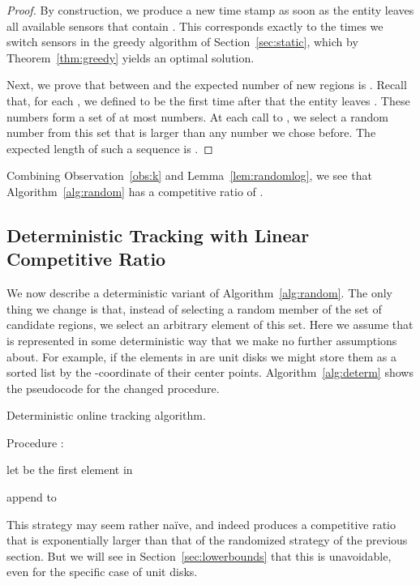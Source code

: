 \documentclass[runningheads]{llncs}
\begin{document}
      \begin {proof}
        By construction, we produce a new time stamp  as soon as the entity leaves all available sensors that contain . This corresponds exactly to the times we switch sensors in the greedy algorithm of Section~\ref {sec:static}, which by Theorem~\ref {thm:greedy} yields an optimal solution.
        
        Next, we prove that between  and  the expected number of new regions is .
        Recall that, for each , we defined  to be the first time after  that the entity leaves .
        These numbers  form a set of at most  numbers. At each call to , we select a random number from this set that is larger than any number we chose before.
        The expected length of such a sequence is .
      \end {proof}

      Combining Observation~\ref {obs:k} and Lemma~\ref {lem:randomlog}, we see
      that Algorithm~\ref {alg:random} has a competitive ratio of .

    \subsection {Deterministic Tracking with Linear Competitive Ratio}
      We now describe a deterministic variant of Algorithm~\ref {alg:random}. The only thing we change is
 that, instead of selecting a random member of the set  of candidate regions, we select an arbitrary element of this set.   Here we assume that  is represented in some deterministic way that we make no further assumptions about. For example, if the elements in  are unit disks we might store them as a sorted list by the -coordinate of their center points. Algorithm~\ref {alg:determ}  shows the pseudocode for the changed procedure.
         
      \begin {algorithm} [ht]
        \caption {Deterministic online tracking algorithm.} \label {alg:determ}
        Procedure :
        \begin {compactenum}
          \item let  be the first element in 
          \item append  to 
        \end {compactenum}
      \end{algorithm}
         
         
      This strategy may seem rather na\"ive, and indeed produces a competitive ratio that is exponentially larger than that of the randomized strategy of the previous section. But we will see in Section~\ref {sec:lowerbounds} that this is unavoidable, even for the specific case of unit disks.
      
\end{document}
